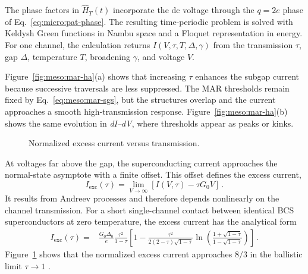             The phase factors in $\hat{H}_T(t)$ incorporate the dc voltage through the $q=2e$ phase of Eq.~\eqref{eq:micro:pat-phase}. The resulting time-periodic problem is solved with Keldysh Green functions in Nambu space and a Floquet representation in energy. For one channel, the calculation returns $I(V,\tau,T,\Delta,\gamma)$ from the transmission $\tau$, gap $\Delta$, temperature $T$, broadening $\gamma$, and voltage $V$.


            Figure~\ref{fig:meso:mar-ha}(a) shows that increasing $\tau$ enhances the subgap current because successive traversals are less suppressed. The MAR thresholds remain fixed by Eq.~\eqref{eq:meso:mar-sgs}, but the structures overlap and the current approaches a smooth high-transmission response. Figure~\ref{fig:meso:mar-ha}(b) shows the same evolution in \textit{dI--dV}, where thresholds appear as peaks or kinks.

            \begin{figure}
                \captionsetup{format=plain}%
                \centering
                \vspace{-1.em}
                \vspace{-0.5em}
                \caption{
                    Normalized excess current versus transmission.
                    }
                \label{fig:meso:mar-excess}
            \end{figure}

            At voltages far above the gap, the superconducting current approaches the normal-state asymptote with a finite offset. This offset defines the excess current,
            \begin{equation}
                I_\mathrm{exc}(\tau)
                =
                \lim_{V\to\infty}\left[I(V,\tau)-\tau G_0V\right]\,.
                \label{eq:meso:mar-excess-current}
            \end{equation}
            It results from Andreev processes and therefore depends nonlinearly on the channel transmission. For a short single-channel contact between identical BCS superconductors at zero temperature, the excess current has the analytical form
            \begin{align}
                I_\mathrm{exc}(\tau)
                ={}& \frac{G_0\Delta_0}{e}\frac{\tau^2}{1-\tau}
                \left[
                    1-
                    \frac{\tau^2}{2(2-\tau)\sqrt{1-\tau}}
                    \ln\!\left(
                        \frac{1+\sqrt{1-\tau}}{1-\sqrt{1-\tau}}
                    \right)
                \right]\,.
                \label{eq:meso:mar-excess-analytical}
            \end{align}
            Figure~\ref{fig:meso:mar-excess} shows that the normalized excess current approaches $8/3$ in the ballistic limit $\tau\to1$ \cite{senkpiel_extracting_2022}.

